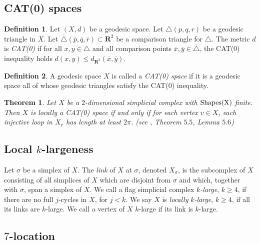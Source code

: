 \documentclass{amsart}
\newtheorem{theorem}{Theorem}[section]
\theoremstyle{definition}
\newtheorem{definition}{Definition}[section]
\theoremstyle{remark}
\numberwithin{equation}{section}
\begin{document}
 \subsection{CAT(0) spaces}


\begin{definition}
Let $(X,d)$ be a geodesic space. Let $\triangle (p,q,r)$ be a geodesic
triangle in $X$. Let $\overline{\triangle}
(\overline{p},\overline{q},\overline{r}) \subset \mathbf{R}^{2}$ be
a comparison triangle for $\triangle$. The metric $d$ is
\emph{CAT(0)} if for all $x,y \in \triangle$ and all comparison
points $\overline{x}, \overline{y} \in \overline{\triangle}$, the
CAT(0) inequality holds 
$d(x,y) \leq d_{\mathbf{R}^{2}}(\overline{x}, \overline{y})$.
\end{definition}


\begin{definition}\label{1.2.2}
A geodesic space $X$ is called a \emph{CAT(0) space} if it is a geodesic
space all of whose geodesic triangles satisfy the CAT(0) inequality.
\end{definition}


\begin{theorem} Let $X$ be a $2$-dimensional simplicial complex with $\rm{Shapes}(X)$ finite. Then $X$ is locally a CAT(0) space if and only
if for each vertex $v \in X$, each injective loop in $X_{v}$ has length at least $2 \pi$.
(see \cite{BH}, Theorem $5.5$, Lemma $5.6$)
\end{theorem}


\subsection{Local $k$-largeness}



Let $\sigma$ be a simplex of $X$.
The \emph{link} of $X$ at $\sigma$, denoted $X_{\sigma}$, is the subcomplex of $X$ consisting of all simplices of $X$ which are disjoint from $\sigma$ and which, together with $\sigma$, span a simplex of $X$.
We call a flag simplicial complex $k$\emph{-large}, $k \geq 4$, if there are no full $j$-cycles in $X$, for $j<k$.
We say $X$ is \emph{locally} $k$\emph{-large}, $k \geq 4$, if all its links are $k$-large.  We call a vertex of $X$ $k$-large if its link is $k$-large.



\subsection{$7$-location}
\end{document}
